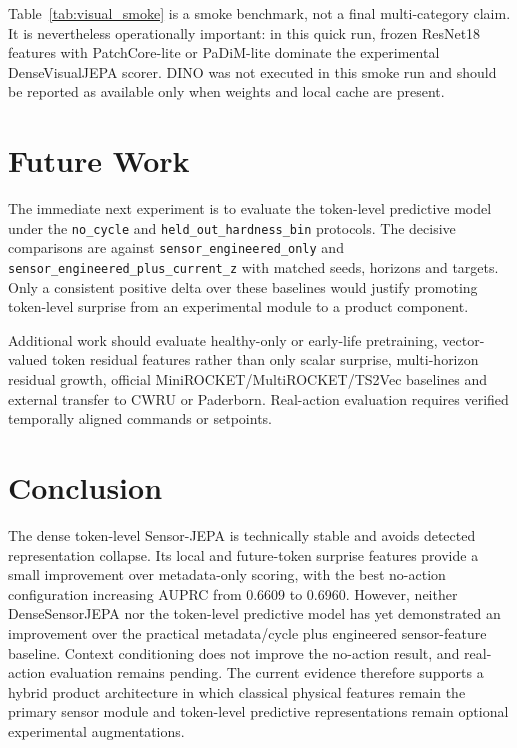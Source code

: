 \documentclass[10pt,journal,compsoc]{IEEEtran}
\begin{document}
Table~\ref{tab:visual_smoke} is a smoke benchmark, not a final multi-category claim. It is nevertheless operationally important: in this quick run, frozen ResNet18 features with PatchCore-lite or PaDiM-lite dominate the experimental DenseVisualJEPA scorer. DINO was not executed in this smoke run and should be reported as available only when weights and local cache are present.

\section{Future Work}
The immediate next experiment is to evaluate the token-level predictive model under the \texttt{no\_cycle} and \texttt{held\_out\_hardness\_bin} protocols. The decisive comparisons are against \texttt{sensor\_engineered\_only} and \texttt{sensor\_engineered\_plus\_current\_z} with matched seeds, horizons and targets. Only a consistent positive delta over these baselines would justify promoting token-level surprise from an experimental module to a product component.

Additional work should evaluate healthy-only or early-life pretraining, vector-valued token residual features rather than only scalar surprise, multi-horizon residual growth, official MiniROCKET/MultiROCKET/TS2Vec baselines and external transfer to CWRU or Paderborn. Real-action evaluation requires verified temporally aligned commands or setpoints.

\section{Conclusion}
The dense token-level Sensor-JEPA is technically stable and avoids detected representation collapse. Its local and future-token surprise features provide a small improvement over metadata-only scoring, with the best no-action configuration increasing AUPRC from 0.6609 to 0.6960. However, neither DenseSensorJEPA nor the token-level predictive model has yet demonstrated an improvement over the practical metadata/cycle plus engineered sensor-feature baseline. Context conditioning does not improve the no-action result, and real-action evaluation remains pending. The current evidence therefore supports a hybrid product architecture in which classical physical features remain the primary sensor module and token-level predictive representations remain optional experimental augmentations.
\end{document}
